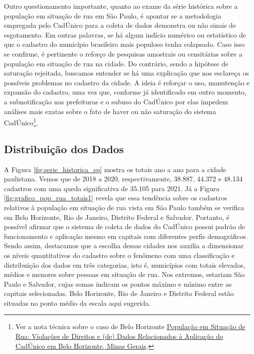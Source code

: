 \documentclass[14pt]{extarticle}
\begin{document}
Outro questionamento importante, quanto ao exame da série histórica sobre a população em situação de rua em São Paulo, é apontar se a metodologia empregada pelo CadÚnico para a coleta de dados demonstra ou não sinais de esgotamento. Em outras palavras, se há algum indício numérico ou estatístico de que o cadastro do município brasileiro mais populoso tenha colapsado. Caso isso se confirme, é pertinente o reforço de pesquisas amostrais ou censitárias sobre a população em situação de rua na cidade. Do contrário, sendo a hipótese de saturação rejeitada, buscamos entender se há uma explicação que nos esclareça os possíveis problemas no cadastro da cidade. A ideia é reforçar o uso, manutenção e expansão do cadastro, uma vez que, conforme já identificado em outro momento, a subnotificação nas prefeituras e o subuso do CadÚnico por elas impedem análises mais exatas sobre o fato de haver ou não saturação do sistema CadÚnico\footnote{Ver a nota técnica sobre o caso de Belo Horizonte \href{https://polos.direito.ufmg.br/wp-content/uploads/2021/09/Nota-Tecnica-inedita-elaborada-pelo-Programa-Polos-de-Cidadania-da-UFMG-sobre-o-CadUnico-em-Belo-Horizonte.pdf}{População em Situação de Rua: Violações de Direitos e (de) Dados Relacionados à Aplicação do CadÚnico em Belo Horizonte, Minas Gerais}.}.\\


\subsection{Distribuição dos Dados}
\label{distribuicao_dados}

A Figura \ref{fig:serie_historica_sp} mostra os totais ano a ano para a cidade paulistana. Vemos que de 2018 a 2020, respectivamente, 38.887, 44.372 e 48.134 cadastros com uma queda significativa de 35.105 para 2021. Já a Figura \ref{fig:grafico_pop_rua_totais1} revela que essa tendência sobre os cadastros relativos à população em situação de rua vista em São Paulo também se verifica em Belo Horizonte, Rio de Janeiro, Distrito Federal e Salvador. Portanto, é possível afirmar que o sistema de coleta de dados do CadÚnico possui padrão de funcionamento e aplicação mesmo em capitais com diferentes perfis demográficos.\\ 

Sendo assim, destacamos que a escolha dessas cidades nos auxilia a dimensionar os níveis quantitativos do cadastro sobre o fenômeno com uma classificação e distribuição dos dados em três categorias, isto é, municípios com totais elevados, médios e menores sobre pessoas em situação de rua. Nos extremos, estariam São Paulo e Salvador, cujas somas indicam os pontos máximo e mínimo entre as capitais selecionadas. Belo Horizonte, Rio de Janeiro e Distrito Federal estão situadas no ponto médio da escala aqui sugerida.\\
\end{document}
